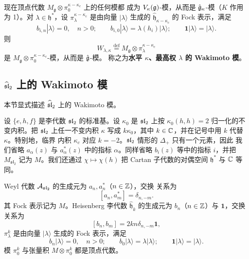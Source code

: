 现在顶点代数 $M_{\mathfrak g}\otimes\pi_0^{\kappa-\kappa_c}$ 上的任何模都
成为 $V_\kappa(\mathfrak{g})$-模，从而是 $\hat{\mathfrak{g}}_\kappa$-模（$K$ 作用为 1）。对
$\lambda\in\mathfrak h^*$，设 $\pi^{\kappa-\kappa_c}_\lambda$ 是由向量
$|\lambda\rangle$ 生成的 $\widehat{\mathfrak h}_{\kappa-\kappa_c}$ 的 Fock
表示，满足
\[
    b_{i,n}|\lambda\rangle=0,\quad n>0;\qquad
    b_{i,0}|\lambda\rangle=\lambda(h_i)|\lambda\rangle;\qquad
    \mathbf 1|\lambda\rangle=|\lambda\rangle.
\]
则
\[
    W_{\lambda,\kappa}\overset{\mathrm{def}}{=}
    M_{\mathfrak g}\otimes\pi^{\kappa-\kappa_c}_\lambda
\]
是 $M_{\mathfrak g}\otimes\pi_0^{\kappa-\kappa_c}$-模，从而是 $\hat{\mathfrak{g}}$-模。
称之为\textbf{水平 $\kappa$、最高权 $\lambda$ 的 Wakimoto 模}。

\subsection{$\widehat{\mathfrak{sl}}_2$ 上的 Wakimoto 模}

本节显式描述 $\widehat{\mathfrak{sl}}_2$ 上的 Wakimoto 模。

设 $\{e,h,f\}$ 是李代数 $\mathfrak{sl}_2$ 的标准基。设 $\kappa_0$ 是 $\mathfrak{sl}_2$ 上按
$\kappa_0(h,h)=2$ 归一化的不变内积。把 $\mathfrak{sl}_2$ 上任一不变内积 $\kappa$ 写成
$k\kappa_0$，其中 $k\in\mathbb{C}$，并在记号中用 $k$ 代替 $\kappa$。特别地，临界
内积 $\kappa_c$ 对应 $k=-2$。$\mathfrak{sl}_2$ 情形的 $\Delta_+$ 只有一个元素，因此
我们省略 $a_\alpha(z)$ 与 $a^*_\alpha(z)$ 中的指标 $\alpha$。同样省略
$b_i(z)$ 等中的指标 $i$，并把 $M_{\mathfrak{sl}_2}$ 记为 $M$。我们还通过
$\chi\mapsto\chi(h)$ 把 Cartan 子代数的对偶空间 $\mathfrak h^*$ 与 $\mathbb{C}$
等同。

Weyl 代数 $\mathcal{A}_{\mathfrak{sl}_2}$ 的生成元为 $a_n,a^*_n$（$n\in\mathbb{Z}$），交换
关系为
\[
    [a_n,a^*_m]=\delta_{n,-m}.
\]
其 Fock 表示记为 $M$。Heisenberg 李代数 $\widehat{\mathfrak h}_k$ 的生成元为
$b_n$（$n\in\mathbb{Z}$）与 $\mathbf 1$，交换关系为
\[
    [b_n,b_m]=2kn\delta_{n,-m}\mathbf 1,
\]
$\pi^k_\lambda$ 是由向量 $|\lambda\rangle$ 生成的 Fock 表示，满足
\[
    b_n|\lambda\rangle=0,\quad n>0;\qquad
    b_0|\lambda\rangle=\lambda|\lambda\rangle;\qquad
    \mathbf 1|\lambda\rangle=|\lambda\rangle.
\]
模 $\pi_0^k$ 与张量积 $M\otimes\pi_0^k$ 都是顶点代数。

